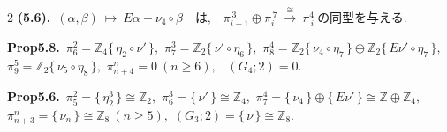 \documentclass[10pt, leqno]{ltjsarticle}
\newcommand{\gen}[1]{\{\,#1\,\}}       %
\numberwithin{equation}{section}
\theoremstyle{plain}
\theoremstyle{definition}
\theoremstyle{remark}
\begin{document}
\begin{paracol}{2}
\noindent
\textbf{(5.6).}\
\((\alpha,\beta)\ \longmapsto\ E\alpha+\nu_{4}\circ\beta
\quad\text{は,}\quad
\pi^{\,3}_{i-1}\oplus \pi^{\,7}_{i}\ \xrightarrow{\ \cong\ }\ \pi_{\,i}^{4}
\ \text{の同型を与える. }\)

\noindent
\textbf{Prop5.8.}\
\(\pi^{2}_{6}=\mathbb Z_4\gen{\eta_{2}\circ\nu'},\) \quad
\(\pi^{3}_{7}=\mathbb Z_2\gen{\nu'\circ\eta_6},\) \quad
\(\pi^{4}_{8}=\mathbb Z_2\gen{\nu_{4}\circ\eta_7}\oplus \mathbb Z_2\gen{E\nu'\circ\eta_7},\) \\
\(\pi^{5}_{9}=\mathbb Z_2\gen{\nu_{5}\circ\eta_8},\) \quad
\(\pi^{n}_{n+4}=0\ (n\ge6),\) \
\((G_{4};2)=0.\)

\noindent
\textbf{Prop5.6.}\
\(\pi^{2}_{5}=\gen{\eta_{2}^{3}}\cong \mathbb Z_{2},\) \quad
\(\pi^{3}_{6}=\gen{\nu'}\cong \mathbb Z_{4},\) \quad
\(\pi^{4}_{7}=\gen{\nu_{4}}\oplus \gen{E\nu'}\cong \mathbb Z\oplus\mathbb Z_{4},\) \\
\(\pi^{n}_{n+3}=\gen{\nu_{n}}\cong \mathbb Z_{8}\ (n\ge5),\)\quad
\((G_{3};2)=\gen{\nu}\cong \mathbb Z_{8}.\)



\end{paracol}
\end{document}
